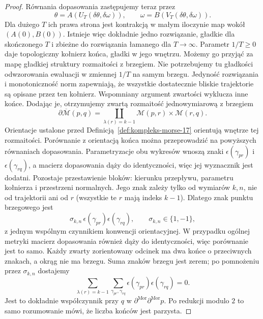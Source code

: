 \begin{proof}
Równania dopasowania zastępujemy teraz przez
\[
 \theta=A(U_T(\delta\theta,\delta\omega)),\qquad
 \omega=B(V_T(\delta\theta,\delta\omega)).
\]
Dla dużego $T$ ich prawa strona jest kontrakcją
w małym iloczynie map wokół $(A(0),B(0))$.
Istnieje więc dokładnie jedno rozwiązanie,
gładkie dla skończonego $T$ i zbieżne do rozwiązania
łamanego dla $T\to\infty$.
Parametr $1/T\geq0$ daje topologiczny kołnierz końca,
gładki w jego wnętrzu. Możemy go przyjąć za mapę
gładkiej struktury rozmaitości z brzegiem.
Nie potrzebujemy tu gładkości odwzorowania ewaluacji
w zmiennej $1/T$ na samym brzegu.
Jedyność rozwiązania i monotoniczność norm zapewniają,
że wszystkie dostatecznie bliskie trajektorie
są opisane przez ten kołnierz.
Wspomniany argument
zwartości wyklucza inne
końce. Dodając je,
otrzymujemy zwartą
rozmaitość jednowymiarową
z brzegiem
\[
 \partial\overline{\mathcal M}(p,q)
  =\coprod_{\lambda(r)=k-1}
      \mathcal M(p,r)\times\mathcal M(r,q).
\]
Orientacje ustalone przed
Definicją~\ref{def:kompleks-morse-17} orientują wnętrze
tej rozmaitości. Porównanie z orientacją końca można
przeprowadzić na powyższych równaniach dopasowania.
Parametryzacje obu wykresów wnoszą znaki
$\epsilon(\gamma_{pr})$ i $\epsilon(\gamma_{rq})$,
a macierz dopasowania dąży do identyczności,
więc jej wyznacznik jest dodatni.
Pozostaje przestawienie bloków: kierunku przepływu,
parametru kołnierza i przestrzeni normalnych.
Jego znak zależy tylko od wymiarów $k,n$, nie od
trajektorii ani od $r$ (wszystkie te $r$ mają indeks $k-1$).
Dlatego znak punktu brzegowego jest
\[
 \sigma_{k,n}\,
 \epsilon(\gamma_{pr})\epsilon(\gamma_{rq}),
 \qquad \sigma_{k,n}\in\{1,-1\},
\]
z jednym wspólnym czynnikiem konwencji orientacyjnej.
W przypadku ogólnej metryki macierz dopasowania
również dąży do identyczności, więc porównanie jest to samo.
Każdy zwarty zorientowany odcinek ma dwa końce
o przeciwnych znakach, a okrąg nie ma brzegu.
Suma znaków brzegu jest zerem; po pomnożeniu przez
$\sigma_{k,n}$ dostajemy
\[
 \sum_{\lambda(r)=k-1}
 \sum_{\gamma_{pr},\gamma_{rq}}
 \epsilon(\gamma_{pr})\epsilon(\gamma_{rq})=0.
\]
Jest to dokładnie współczynnik przy $q$ w
$\partial^{\mathrm{Mor}}\partial^{\mathrm{Mor}}p$.
Po redukcji modulo $2$
to samo rozumowanie
mówi, że liczba
końców jest parzysta.
\end{proof}

